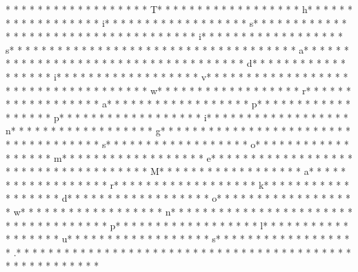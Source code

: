 * * *  * * *  * * *  *  * * *  *  * * *  * T* * *  * * *  * * *  *  * * *  *  * * *  * h* * *  * * *  * * *  *  * * *  *  * * *  * i* * *  * * *  * * *  *  * * *  *  * * *  * s* * *  * * *  * * *  *  * * *  *  * * *  *  * * *  * * *  * * *  *  * * *  *  * * *  * i* * *  * * *  * * *  *  * * *  *  * * *  * s* * *  * * *  * * *  *  * * *  *  * * *  *  * * *  * * *  * * *  *  * * *  *  * * *  * a* * *  * * *  * * *  *  * * *  *  * * *  *  * * *  * * *  * * *  *  * * *  *  * * *  * d* * *  * * *  * * *  *  * * *  *  * * *  * i* * *  * * *  * * *  *  * * *  *  * * *  * v* * *  * * *  * * *  *  * * *  *  * * *  *  * * *  * * *  * * *  *  * * *  *  * * *  * w* * *  * * *  * * *  *  * * *  *  * * *  * r* * *  * * *  * * *  *  * * *  *  * * *  * a* * *  * * *  * * *  *  * * *  *  * * *  * p* * *  * * *  * * *  *  * * *  *  * * *  * p* * *  * * *  * * *  *  * * *  *  * * *  * i* * *  * * *  * * *  *  * * *  *  * * *  * n* * *  * * *  * * *  *  * * *  *  * * *  * g* * *  * * *  * * *  *  * * *  *  * * *  *  * * *  * * *  * * *  *  * * *  *  * * *  * s* * *  * * *  * * *  *  * * *  *  * * *  * o* * *  * * *  * * *  *  * * *  *  * * *  * m* * *  * * *  * * *  *  * * *  *  * * *  * e* * *  * * *  * * *  *  * * *  *  * * *  *  * * *  * * *  * * *  *  * * *  *  * * *  * M* * *  * * *  * * *  *  * * *  *  * * *  * a* * *  * * *  * * *  *  * * *  *  * * *  * r* * *  * * *  * * *  *  * * *  *  * * *  * k* * *  * * *  * * *  *  * * *  *  * * *  * d* * *  * * *  * * *  *  * * *  *  * * *  * o* * *  * * *  * * *  *  * * *  *  * * *  * w* * *  * * *  * * *  *  * * *  *  * * *  * n* * *  * * *  * * *  *  * * *  *  * * *  *  * * *  * * *  * * *  *  * * *  *  * * *  * p* * *  * * *  * * *  *  * * *  *  * * *  * l* * *  * * *  * * *  *  * * *  *  * * *  * u* * *  * * *  * * *  *  * * *  *  * * *  * s* * *  * * *  * * *  *  * * *  *  * * *  * .* * *  * * *  * * *  *  * * *  *  * * *  *  * * *  * * *  * * *  *  * * *  *  * * *  *  * * *  * * *  * * *  *  * * *  *  * * *  * 
